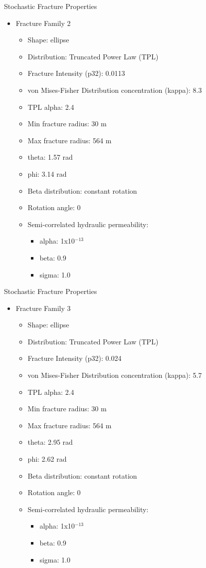\documentclass{beamer}
\begin{document}
\begin{frame}
	
	Stochastic Fracture Properties
	\begin{itemize}
		\item Fracture Family 2
		\begin{itemize}
			\item Shape: ellipse
			\item Distribution: Truncated Power Law (TPL)
			\item Fracture Intensity (p32): 0.0113
			\item von Mises-Fisher Distribution concentration (kappa): 8.3
			\item TPL alpha: 2.4
			\item Min fracture radius: 30 m
			\item Max fracture radius: 564 m
			\item theta: 1.57 rad
			\item phi: 3.14 rad
			\item Beta distribution: constant rotation
			\item Rotation angle: 0
			\item Semi-correlated hydraulic permeability:
			\begin{itemize}
				\item alpha: 1x10$^{-13}$
				\item beta: 0.9
				\item sigma: 1.0
			\end{itemize}
		\end{itemize}
	\end{itemize}

	Stochastic Fracture Properties
	\begin{itemize}
		\item Fracture Family 3
		\begin{itemize}
			\item Shape: ellipse
			\item Distribution: Truncated Power Law (TPL)
			\item Fracture Intensity (p32): 0.024
			\item von Mises-Fisher Distribution concentration (kappa): 5.7
			\item TPL alpha: 2.4
			\item Min fracture radius: 30 m
			\item Max fracture radius: 564 m
			\item theta: 2.95 rad
			\item phi: 2.62 rad
			\item Beta distribution: constant rotation
			\item Rotation angle: 0
			\item Semi-correlated hydraulic permeability:
			\begin{itemize}
				\item alpha: 1x10$^{-13}$
				\item beta: 0.9
				\item sigma: 1.0
			\end{itemize}
		\end{itemize}
	\end{itemize}


\end{frame}
\end{document}
